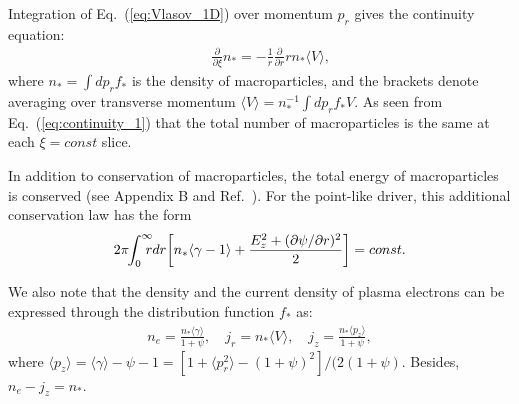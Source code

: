 \documentclass[twocolumn,showpacs,aip]{revtex4}
\begin{document}
Integration of  Eq.~(\ref{eq:Vlasov_1D}) over momentum $p_r$ gives the  continuity equation:
\begin{eqnarray}
&&\frac{\partial}{\partial \xi}n_{*}=
-\frac{1}{r}\frac{\partial }{\partial {{r}}}r {{n}}_{*}\langle V\rangle, 
\label{eq:continuity_1}
\end{eqnarray}
where    $n_{*}=\int d {{p}}_{r}f_{*}$ is the   density of macroparticles, and the brackets denote averaging over transverse momentum $\langle V\rangle={{n}}_{*}^{-1}\int d {{p}}_{r}f_{*}V$.
As seen from Eq.~(\ref{eq:continuity_1}) that the total number of  macroparticles is the same at each  $\xi=const$ slice. 

In addition to conservation  of macroparticles, the total energy of  macroparticles  is  conserved (see  Appendix B and Ref.~\cite{Mora_1997}). For the point-like driver, this additional conservation law has  the  form  
\begin{eqnarray}
2\pi\hspace{-1mm} \int_{0}^{\infty}\hspace{-2.5mm}rdr\bigg[n_*\langle\gamma-1\rangle+\frac{E_z^2+(\partial\psi/\partial r)^2}{2}
\bigg]=const.
\label{eq:conserv_energy1}
\end{eqnarray}


We also note that  the density and the current density of plasma electrons can be expressed through the distribution function  $f_*$ as:
 \begin{eqnarray}
n_e=\frac{n_*\langle \gamma \rangle}{1+\psi},\quad j_{r}=n_*\langle V\rangle, %
\quad j_z=\frac{n_*\langle p_z\rangle}{1+\psi},\label{eq:Jr}
\end{eqnarray}
 where $\langle p_z\rangle=\langle \gamma \rangle-\psi-1=[1+\langle p_r^2\rangle-(1+\psi)^2]/(2(1+\psi)$. Besides, $n_e-j_z=n_*$. 
\end{document}
